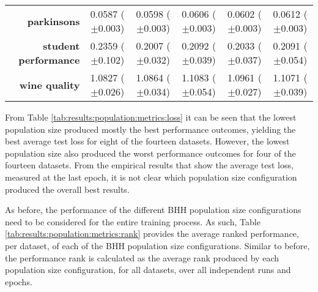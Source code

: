 \begin{table}[htb]
{\begin{tabular}{r|ccccc}
                  \textbf{parkinsons}          & \cellcolor[rgb]{ .388,  .745,  .482}0.0587 ($\pm$0.003)     & \cellcolor[rgb]{ .82,  .867,  .506}0.0598 ($\pm$0.003)  & \cellcolor[rgb]{ .988,  .694,  .475}0.0606 ($\pm$0.003) & \cellcolor[rgb]{ 1,  .922,  .518}0.0602 ($\pm$0.003)   & \cellcolor[rgb]{ .973,  .412,  .42}0.0612 ($\pm$0.003)  \\
                  \textbf{student performance} & \cellcolor[rgb]{ .973,  .412,  .42}0.2359 ($\pm$0.102)      & \cellcolor[rgb]{ .388,  .745,  .482}0.2007 ($\pm$0.032) & \cellcolor[rgb]{ 1,  .922,  .518}0.2092 ($\pm$0.039)    & \cellcolor[rgb]{ .573,  .796,  .49}0.2033 ($\pm$0.037) & \cellcolor[rgb]{ 1,  .922,  .518}0.2091 ($\pm$0.054)    \\
                  \textbf{wine quality}        & \cellcolor[rgb]{ .388,  .745,  .482}1.0827 ($\pm$0.026)     & \cellcolor[rgb]{ .553,  .792,  .49}1.0864 ($\pm$0.034)  & \cellcolor[rgb]{ .973,  .412,  .42}1.1083 ($\pm$0.054)  & \cellcolor[rgb]{ 1,  .922,  .518}1.0961 ($\pm$0.027)   & \cellcolor[rgb]{ .976,  .463,  .431}1.1071 ($\pm$0.039) \\
            \end{tabular}%

      }
\end{table}%

From Table \ref{tab:results:population:metrics:loss} it can be seen that the lowest population size produced mostly the best performance outcomes, yielding the best average test loss for eight of the fourteen datasets. However, the lowest population size also produced the worst performance outcomes for four of the fourteen datasets. From the empirical results that show the average test loss, measured at the last epoch, it is not clear which population size configuration produced the overall best results.

As before, the performance of the different \acs{BHH} population size configurations need to be considered for the entire training process. As such, Table \ref{tab:results:population:metrics:rank} provides the average ranked performance, per dataset, of each of the \acs{BHH} population size configurations. Similar to before, the performance rank is calculated as the average rank produced by each population size configuration, for all datasets, over all independent runs and epochs.

